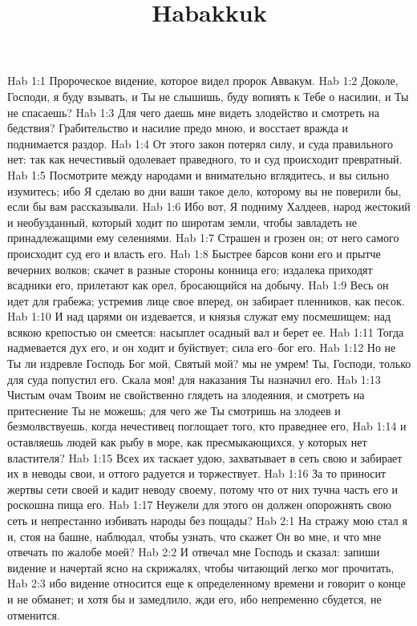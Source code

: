 

\title{Habakkuk}

Hab 1:1  Пророческое видение, которое видел пророк Аввакум.
Hab 1:2  Доколе, Господи, я буду взывать, и Ты не слышишь, буду вопиять к Тебе о насилии, и Ты не спасаешь?
Hab 1:3  Для чего даешь мне видеть злодейство и смотреть на бедствия? Грабительство и насилие предо мною, и восстает вражда и поднимается раздор.
Hab 1:4  От этого закон потерял силу, и суда правильного нет: так как нечестивый одолевает праведного, то и суд происходит превратный.
Hab 1:5  Посмотрите между народами и внимательно вглядитесь, и вы сильно изумитесь; ибо Я сделаю во дни ваши такое дело, которому вы не поверили бы, если бы вам рассказывали.
Hab 1:6  Ибо вот, Я подниму Халдеев, народ жестокий и необузданный, который ходит по широтам земли, чтобы завладеть не принадлежащими ему селениями.
Hab 1:7  Страшен и грозен он; от него самого происходит суд его и власть его.
Hab 1:8  Быстрее барсов кони его и прытче вечерних волков; скачет в разные стороны конница его; издалека приходят всадники его, прилетают как орел, бросающийся на добычу.
Hab 1:9  Весь он идет для грабежа; устремив лице свое вперед, он забирает пленников, как песок.
Hab 1:10  И над царями он издевается, и князья служат ему посмешищем; над всякою крепостью он смеется: насыплет осадный вал и берет ее.
Hab 1:11  Тогда надмевается дух его, и он ходит и буйствует; сила его--бог его.
Hab 1:12  Но не Ты ли издревле Господь Бог мой, Святый мой? мы не умрем! Ты, Господи, только для суда попустил его. Скала моя! для наказания Ты назначил его.
Hab 1:13  Чистым очам Твоим не свойственно глядеть на злодеяния, и смотреть на притеснение Ты не можешь; для чего же Ты смотришь на злодеев и безмолвствуешь, когда нечестивец поглощает того, кто праведнее его,
Hab 1:14  и оставляешь людей как рыбу в море, как пресмыкающихся, у которых нет властителя?
Hab 1:15  Всех их таскает удою, захватывает в сеть свою и забирает их в неводы свои, и оттого радуется и торжествует.
Hab 1:16  За то приносит жертвы сети своей и кадит неводу своему, потому что от них тучна часть его и роскошна пища его.
Hab 1:17  Неужели для этого он должен опорожнять свою сеть и непрестанно избивать народы без пощады?
Hab 2:1  На стражу мою стал я и, стоя на башне, наблюдал, чтобы узнать, что скажет Он во мне, и что мне отвечать по жалобе моей?
Hab 2:2  И отвечал мне Господь и сказал: запиши видение и начертай ясно на скрижалях, чтобы читающий легко мог прочитать,
Hab 2:3  ибо видение относится еще к определенному времени и говорит о конце и не обманет; и хотя бы и замедлило, жди его, ибо непременно сбудется, не отменится.
